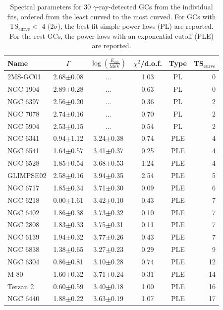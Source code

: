 \documentclass[doublespace,draft,nopageskip]{VTthesis} %
\begin{document}
\begin{table}
\centering
\caption{Spectral parameters for 30 $\gamma$-ray-detected GCs from the individual fits, ordered from the least curved to the most curved. For GCs with TS$_\mathrm{curve} <$ 4 (2$\sigma$), the best-fit simple power laws (PL) are reported. For the rest GCs, the power laws with an exponential cutoff (PLE) are reported. }\label{tab:spectra}
\begin{threeparttable}
\begin{tabular}{lccccr}
\hline
Name&$\Gamma$ & $\log\left(\frac{E_\mathrm{cut}}{\mathrm{MeV}}\right)$ & $\chi^2$/d.o.f. & Type\tnote{a} & TS$_\mathrm{curve}$\\
\hline
2MS-GC01 & {2.68$\pm$0.08} & ... & 1.03 & PL & 0 \\
NGC 1904 & {2.89$\pm$0.28} & ... & 0.63 & PL & 0 \\
NGC 6397 & {2.56$\pm$0.20} & ... & 0.36 & PL & 2 \\
NGC 7078 & {2.74$\pm$0.16} & ... & 0.70 & PL & 2 \\
NGC 5904 & {2.53$\pm$0.15} & ... & 0.54 & PL & 2 \\
\hline
NGC 6341 & 0.94$\pm$1.12 & {3.24$\pm$0.38} & 0.74 & PLE & 4 \\
NGC 6541 & 1.64$\pm$0.57 & {3.41$\pm$0.37} & 0.25 & PLE & 4 \\
NGC 6528 & 1.85$\pm$0.54 & {3.68$\pm$0.53} & 1.24 & PLE & 4 \\
GLIMPSE02 & 2.58$\pm$0.16 & {3.94$\pm$0.35} & 2.54 & PLE & 5 \\
NGC 6717 & 1.85$\pm$0.34 & {3.71$\pm$0.30} & 0.09 & PLE & 6 \\
NGC 6218 & 0.00$\pm$1.61 & {3.42$\pm$0.10} & 0.43 & PLE & 7 \\
NGC 6402 & 1.86$\pm$0.38 & {3.73$\pm$0.32} & 0.10 & PLE & 7 \\
NGC 2808 & 1.83$\pm$0.33 & {3.75$\pm$0.31} & 0.11 & PLE & 7 \\
NGC 6139 & 1.94$\pm$0.32 & {3.77$\pm$0.26} & 0.43 & PLE & 7 \\
NGC 6838 & 1.38$\pm$0.65 & {3.27$\pm$0.23} & 0.29 & PLE & 9 \\
NGC 6304 & 0.86$\pm$0.81 & {3.10$\pm$0.28} & 0.74 & PLE & 12 \\
M 80 & 1.60$\pm$0.32 & {3.71$\pm$0.24} & 0.31 & PLE & 14 \\
Terzan 2 & 0.60$\pm$0.59 & {3.40$\pm$0.18} & 1.00 & PLE & 16 \\
NGC 6440 & 1.88$\pm$0.22 & {3.63$\pm$0.19} & 1.07 & PLE & 17 \\

\end{tabular}
\end{threeparttable}
\end{table}
\end{document}
